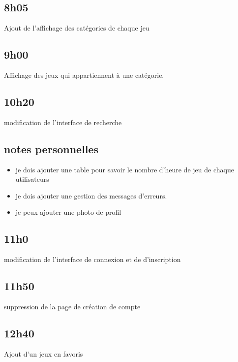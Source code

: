 \documentclass[a4paper,12pt,french]{sphinxmanual}
\begin{document}
\subsection{8h05}
\label{\detokenize{logbook:id14}}
\sphinxAtStartPar
Ajout de l’affichage des catégories de chaque jeu


\subsection{9h00}
\label{\detokenize{logbook:id15}}
\sphinxAtStartPar
Affichage des jeux qui appartiennent à une catégorie.


\subsection{10h20}
\label{\detokenize{logbook:id16}}
\sphinxAtStartPar
modification de l’interface de recherche


\subsection{notes personnelles}
\label{\detokenize{logbook:notes-personnelles}}\begin{itemize}
\item {} 
\sphinxAtStartPar
je dois ajouter une table pour savoir le nombre d’heure de jeu de chaque utilisateurs

\item {} 
\sphinxAtStartPar
je dois ajouter une gestion des messages d’erreurs.

\item {} 
\sphinxAtStartPar
je peux ajouter une photo de profil

\end{itemize}


\subsection{11h0}
\label{\detokenize{logbook:h0}}
\sphinxAtStartPar
modification de l’interface de connexion et de d’inscription


\subsection{11h50}
\label{\detokenize{logbook:h50}}
\sphinxAtStartPar
suppression de la page de création de compte


\subsection{12h40}
\label{\detokenize{logbook:id17}}
\sphinxAtStartPar
Ajout d’un jeux en favoris
\end{document}
